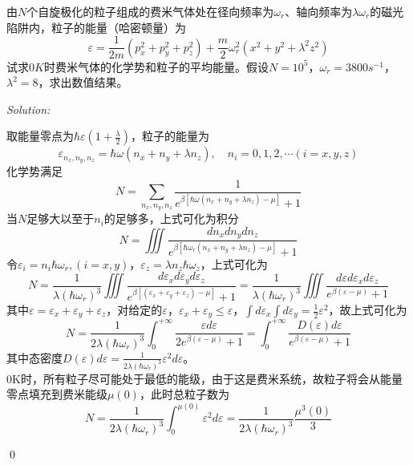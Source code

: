 \documentclass[12pt,a4paper]{article}
\newenvironment{problem}[2][Problem]{\begin{trivlist}
\item[\hskip \labelsep {\bfseries #1}\hskip \labelsep {\bfseries #2.}]}{\end{trivlist}}
\newenvironment{sol}
    {\emph{Solution:}
    }
    {
    \qed
    }
\begin{document}
\begin{problem}{8.22}
由$N$个自旋极化的粒子组成的费米气体处在径向频率为$\omega_r$、轴向频率为$\lambda\omega_r$的磁光陷阱内，粒子的能量（哈密顿量）为
\[
\varepsilon=\frac{1}{2m}(p_x^2+p_y^2+p_z^2)+\frac{m}{2}\omega_r^2(x^2+y^2+\lambda^2z^2)
\]
试求$0K$时费米气体的化学势和粒子的平均能量。假设$N=10^5$，$\omega_r=3800s^{-1}$，$\lambda^2=8$，求出数值结果。
\end{problem}
\begin{sol}
取能量零点为$\hbar\varepsilon\left(1+\frac{\lambda}{2}\right)$，粒子的能量为
\begin{equation}
\varepsilon_{n_x,n_y,n_z}=\hbar\omega(n_x+n_y+\lambda n_z),\quad n_i=0,1,2,\cdots(i=x,y,z)
\end{equation}
化学势满足
\begin{equation}
N=\sum_{n_x,n_y,n_z}\frac{1}{e^{\beta[\hbar\omega(n_x+n_y+\lambda n_z)-\mu]}+1}
\end{equation}
当$N$足够大以至于$n_i$的足够多，上式可化为积分
\begin{equation}
N=\iiint\frac{dn_xdn_ydn_z}{e^{\beta[\hbar\omega_r(n_x+n_y+\lambda n_z)-\mu]}+1}
\end{equation}
令$\varepsilon_i=n_i\hbar\omega_r,(i=x,y)$，$\varepsilon_z=\lambda n_z\hbar\omega_z$，上式可化为
\begin{equation}
N=\frac{1}{\lambda(\hbar\omega_r)^3}\iiint\frac{d\varepsilon_xd\varepsilon_yd\varepsilon_z}{e^{\beta[(\varepsilon_x+\varepsilon_y+\varepsilon_z)-\mu]}+1}=\frac{1}{\lambda(\hbar\omega_r)^3}\iiint\frac{d\varepsilon d\varepsilon_xd\varepsilon_z}{e^{\beta(\varepsilon-\mu)}+1}
\end{equation}
其中$\varepsilon=\varepsilon_x+\varepsilon_y+\varepsilon_z$，对给定的$\varepsilon$，$\varepsilon_x+\varepsilon_y\leq\varepsilon$，$\int d\varepsilon_x\int d\varepsilon_y=\frac{1}{2}\varepsilon^2$，故上式可化为
\begin{equation}
N=\frac{1}{2\lambda(\hbar\omega_r)^3}\int_0^{+\infty}\frac{\varepsilon d\varepsilon}{2e^{\beta(\varepsilon-\mu)}+1}=\int_0^{+\infty}\frac{D(\varepsilon)d\varepsilon}{e^{\beta(\varepsilon-\mu)}+1}
\end{equation}
其中态密度$D(\varepsilon)d\varepsilon=\frac{1}{2\lambda(\hbar\omega_r)^3}\varepsilon^2d\varepsilon$。\\
$0$K时，所有粒子尽可能处于最低的能级，由于这是费米系统，故粒子将会从能量零点填充到费米能级$\mu(0)$，此时总粒子数为
\begin{equation}
N=\frac{1}{2\lambda(\hbar\omega_r)^3}\int_0^{\mu(0)}\varepsilon^2d\varepsilon=\frac{1}{2\lambda(\hbar\omega_r)^3}\frac{\mu^3(0)}{3}

\end{equation}
\end{sol}
\end{document}
